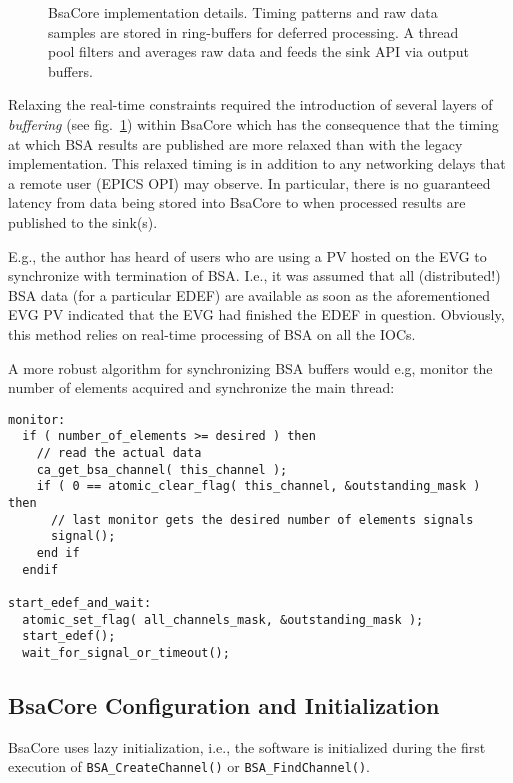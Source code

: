 \documentclass[11pt]{article}
\newcommand{\bsac}{BsaCore}
\newcommand{\bsa} {BSA}
\newcommand{\EDEF}{EDEF}
\newcommand{\cod}[1]{{\tt#1}}
\newcounter{figs}
\newcommand{\fig}[3][0]{
\refstepcounter{figs}
\hfill\resizebox{#2}{!}{
        \rotatebox{#1}{\texttt{[image: \#3]}}}\hspace*{\fill}
}
\begin{document}
\begin{figure}
\fig{0.5\textwidth}{fig_impl.eps}
\label{fig:impl}
\caption{\bsac{} implementation details. Timing patterns and raw data samples
         are stored in ring-buffers for deferred processing. A thread pool
         filters and averages raw data and feeds the sink API via output
         buffers.}
\end{figure}

Relaxing the real-time constraints required the introduction of several
layers of {\em buffering} (see fig.~\ref{fig:impl}) within \bsac{} which
has the consequence that the timing at which \bsa{} results are published
are more relaxed than with the legacy implementation.
This relaxed timing is in addition to any
networking delays that a remote user (EPICS OPI) may observe. In particular,
there is no guaranteed latency from data being stored into \bsac{} to when
processed results are published to the sink(s).

E.g., the author has heard of users who are using a PV hosted on the EVG
to synchronize with termination of \bsa{}. I.e., it was assumed that
all (distributed!) \bsa{} data (for a particular \EDEF{}) are available
as soon as the aforementioned EVG PV indicated that the EVG had finished the
\EDEF{} in question. Obviously, this method relies on real-time
processing of \bsa{} on all the IOCs.

A more robust algorithm for synchronizing \bsa{} buffers would
e.g, monitor the number of elements acquired and synchronize
the main thread:
\begin{lstlisting}
monitor:
  if ( number_of_elements >= desired ) then
    // read the actual data
    ca_get_bsa_channel( this_channel );
    if ( 0 == atomic_clear_flag( this_channel, &outstanding_mask ) then
      // last monitor gets the desired number of elements signals
      signal();
    end if
  endif

start_edef_and_wait:
  atomic_set_flag( all_channels_mask, &outstanding_mask );
  start_edef();
  wait_for_signal_or_timeout();
\end{lstlisting}

\subsection{\bsac{} Configuration and Initialization}
\bsac{} uses lazy initialization, i.e., the software is initialized
during the first execution of
\cod{BSA\_CreateChannel()} or \cod{BSA\_FindChannel()}.
\end{document}
